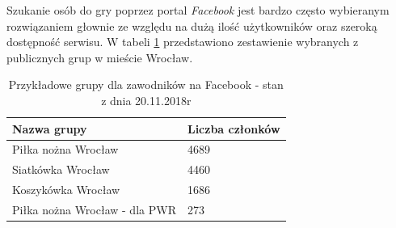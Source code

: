 Szukanie osób do gry poprzez portal \textit{Facebook} jest bardzo często wybieranym rozwiązaniem głownie ze względu na dużą ilość użytkowników oraz szeroką dostępność serwisu. W tabeli \ref{tab:fbgrupy} przedstawiono zestawienie wybranych z publicznych grup w mieście Wrocław.


\begin{table}[htb]
\centering\small
\caption{Przykładowe grupy dla zawodników na Facebook - stan z dnia 20.11.2018r}
\label{tab:fbgrupy}
\begin{tabularx}{\linewidth}{|p{.55\linewidth}|X|}\hline
Nazwa grupy & Liczba członków \\ \hline\hline
Piłka nożna Wrocław & 4689  \\ \hline
Siatkówka Wrocław & 4460  \\ \hline
Koszykówka Wrocław & 1686 \\ \hline
Piłka nożna Wrocław - dla PWR & 273  \\ \hline
\end{tabularx}
\end{table}
